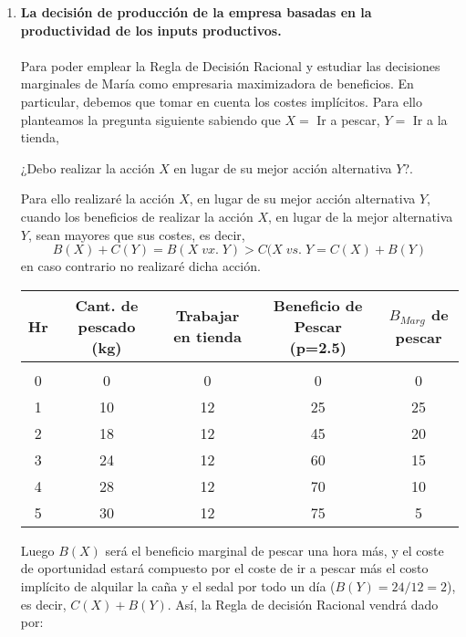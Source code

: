 \begin{enumerate}
\begin{enumerate}[\bfseries 2.1]
	    \item \textbf{La decisión de producción de la empresa basadas en la productividad de los inputs productivos.}\\\\
		Para poder emplear la Regla de Decisión Racional y estudiar las decisiones marginales de María como empresaria maximizadora de beneficios. En particular, debemos que tomar en cuenta los costes implícitos. Para ello planteamos la pregunta siguiente sabiendo que $X = $ Ir a pescar, $Y = $ Ir a la tienda,
		\begin{tcolorbox}[colframe=white]
		    \begin{center}
			¿Debo realizar la acción $X$ en lugar de su mejor acción alternativa $Y$?.
		    \end{center}
		\end{tcolorbox}

		Para ello realizaré la acción $X$, en lugar de su mejor acción alternativa $Y$, cuando los beneficios de realizar la acción $X$, en lugar de la mejor alternativa $Y$, sean mayores que sus costes, es decir,
		$$B(X)+C(Y) = B(X \; vx. \; Y) > C(X \; vs. \; Y = C(X)+B(Y)$$
		en caso contrario no realizaré dicha acción.\\

		\begin{center}
		    \begin{tabular}{ccccc}
			Hr&Cant. de pescado (kg)&Trabajar en tienda&Beneficio de Pescar (p=2.5)&$B_{Marg}$ de pescar\\
			\hline\\
			     0&0&0&0&0\\
			     1&10&12&25&25\\
			     2&18&12&45&20\\
			     3&24&12&60&15\\
			     4&28&12&70&10\\
			     5&30&12&75&5\\
		    \end{tabular}
		\end{center}
		\vspace{.5cm}

		Luego $B(X)$ será  el beneficio marginal de pescar una hora más, y  el coste de oportunidad estará compuesto por el coste de ir a pescar más el costo implícito de alquilar la caña y el sedal por todo un día ($B(Y) = 24/12 = 2$), es decir, $C(X)+B(Y)$. Así, la Regla de decisión Racional vendrá dado por:\\


\end{enumerate}
\end{enumerate}
